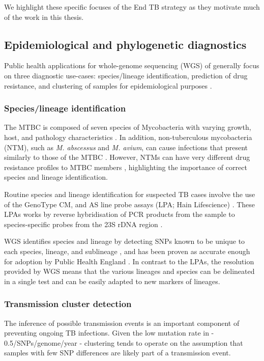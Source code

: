We highlight these specific focuses of the End TB strategy as they motivate much of the work in this thesis.

\subsection{Epidemiological and phylogenetic diagnostics}
Public health applications for whole-genome sequencing (WGS) of \mtb{} generally focus on three diagnostic use-cases: species/lineage identification, prediction of drug resistance, and clustering of samples for epidemiological purposes \cite{Gordon2021,Meehan2019}.

\subsubsection{Species/lineage identification}
The MTBC is composed of seven species of Mycobacteria with varying growth, host, and pathology characteristics \cite{Homolka2012}. In addition, non-tuberculous mycobacteria (NTM), such as \textit{M. abscessus} and \textit{M. avium}, can cause infections that present similarly to those of the MTBC \cite{Johansen2020}. However, NTMs can have very different drug resistance profiles to MTBC members \cite{Floto2016,Johansen2020}, highlighting the importance of correct species and lineage identification.

Routine species and lineage identification for suspected TB cases involve the use of the GenoType CM, and AS line probe assays (LPA; Hain Lifescience) \cite{Makinen2006,Quan2018}. These LPAs works by reverse hybridisation of PCR products from the sample to species-specific probes from the 23S rDNA region \cite{Makinen2006}. 

WGS identifies species and lineage by detecting SNPs known to be unique to each species, lineage, and sublineage \cite{Coll2014,Homolka2012,Stucki2016standard,Lipworth2019,Freschi2020}, and has been proven as accurate enough for adoption by Public Health England \cite{Quan2018}. In contrast to the LPAs, the resolution provided by WGS means that the various lineages and species can be delineated in a single test and can be easily adapted to new markers of lineages.

\subsubsection{Transmission cluster detection}
The inference of possible transmission events is an important component of preventing ongoing TB infections. Given the low mutation rate in \mtb{} - 0.5/SNPs/genome/year \cite{walker2013} - clustering tends to operate on the assumption that samples with few SNP differences are likely part of a transmission event. 

